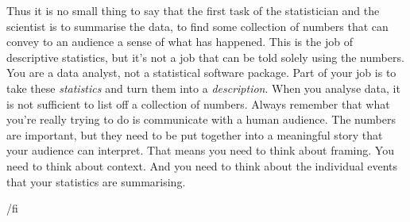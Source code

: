Thus it is no small thing to say that the first task of the statistician and the scientist is to summarise the data, to find some collection of numbers that can convey to an audience a sense of what has happened. This is the job of descriptive statistics, but it's not a job that can be told solely using the numbers. You are a data analyst, not a statistical software package. Part of your job is to take these {\it statistics} and turn them into a {\it description}. When you analyse data, it is not sufficient to list off a collection of numbers. Always remember that what you're really trying to do is communicate with a human audience. The numbers are important, but they need to be put together into a meaningful story that your audience can interpret. That means you need to think about framing. You need to think about context. And you need to think about the individual events that your statistics are summarising. 





/fi %
